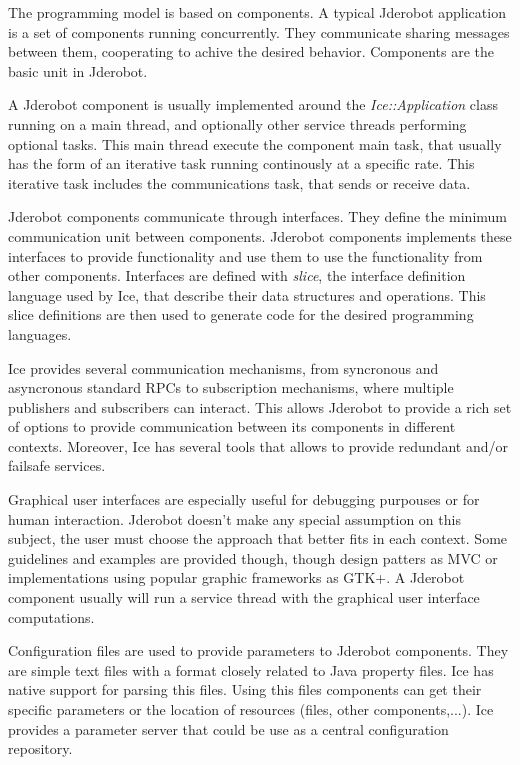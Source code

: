 \documentclass[twocolumn]{svjour3}          %
\begin{document}
The programming model is based on components. A typical Jderobot application is a set of components running concurrently. They communicate sharing messages between them, cooperating to achive the desired behavior. Components are the basic unit in Jderobot.

A Jderobot component is usually implemented around the \textit{Ice::Application} class running on a main thread, and optionally other service threads performing optional tasks. This main thread execute the component main task, that usually has the form of an iterative task running continously at a specific rate. This iterative task includes the communications task, that sends or receive data.

Jderobot components communicate through interfaces. They define the minimum communication unit between components. Jderobot components implements these interfaces to provide functionality and use them to use the functionality from other components. Interfaces are defined with \textit{slice}, the interface definition language used by Ice, that describe their data structures and operations. This slice definitions are then used to generate code for the desired programming languages.

Ice provides several communication mechanisms, from syncronous and asyncronous standard RPCs to subscription mechanisms, where multiple publishers and subscribers can interact. This allows Jderobot to provide a rich set of options to provide communication between its components in different contexts. Moreover, Ice has several tools that allows to provide redundant and/or failsafe services.

Graphical user interfaces are especially useful for debugging purpouses or for human interaction. Jderobot doesn't make any special assumption on this subject, the user must choose the approach that better fits in each context. Some guidelines and examples are provided though, though design patters as MVC or implementations using popular graphic frameworks as GTK+. A Jderobot component usually will run a service thread with the graphical user interface computations.

Configuration files are used to provide parameters to Jderobot components. They are simple text files with a format closely related to Java property files. Ice has native support for parsing this files. Using this files components can get their specific parameters or the location of resources (files, other components,...). Ice provides a parameter server that could be use as a central configuration repository.
\end{document}

